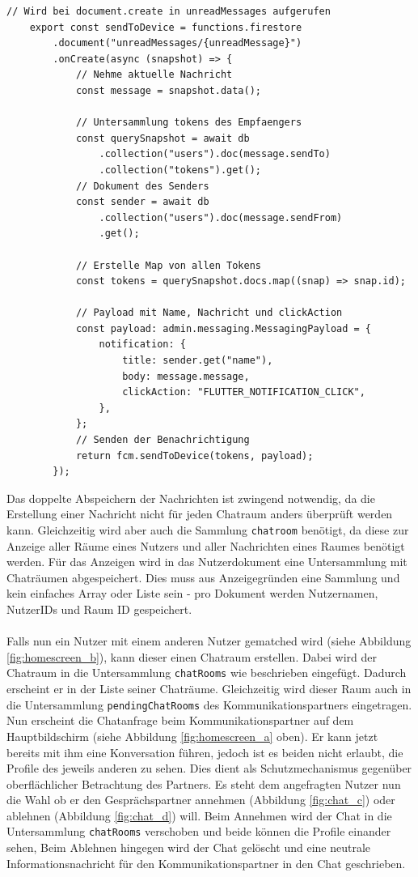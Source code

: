 \begin{lstlisting}[caption=Cloud Functions zur Erstellung von Benachrichtigungen, label=lst:chat_functions]
	// Wird bei document.create in unreadMessages aufgerufen
	export const sendToDevice = functions.firestore
		.document("unreadMessages/{unreadMessage}")
		.onCreate(async (snapshot) => {
			// Nehme aktuelle Nachricht
			const message = snapshot.data();
		
			// Untersammlung tokens des Empfaengers
			const querySnapshot = await db
				.collection("users").doc(message.sendTo)
				.collection("tokens").get();
			// Dokument des Senders
			const sender = await db
				.collection("users").doc(message.sendFrom)
				.get();
			
			// Erstelle Map von allen Tokens
			const tokens = querySnapshot.docs.map((snap) => snap.id);
			
			// Payload mit Name, Nachricht und clickAction
			const payload: admin.messaging.MessagingPayload = {
				notification: {
					title: sender.get("name"),
					body: message.message,
					clickAction: "FLUTTER_NOTIFICATION_CLICK",
				},
			};
			// Senden der Benachrichtigung
			return fcm.sendToDevice(tokens, payload);
		});
\end{lstlisting}

\noindent
Das doppelte Abspeichern der Nachrichten ist zwingend notwendig, da die Erstellung einer Nachricht nicht für jeden Chatraum anders überprüft werden kann.
Gleichzeitig wird aber auch die Sammlung \texttt{chatroom} benötigt, da diese zur Anzeige aller Räume eines Nutzers und aller Nachrichten eines Raumes benötigt werden.
Für das Anzeigen wird in das Nutzerdokument eine Untersammlung mit Chaträumen abgespeichert.
Dies muss aus Anzeigegründen eine Sammlung und kein einfaches Array oder Liste sein - pro Dokument werden Nutzernamen, NutzerIDs und Raum ID gespeichert.\\
\\
Falls nun ein Nutzer mit einem anderen Nutzer gematched wird (siehe Abbildung \ref{fig:homescreen_b}), kann dieser einen Chatraum erstellen.
Dabei wird der Chatraum in die Untersammlung \texttt{chatRooms} wie beschrieben eingefügt.
Dadurch erscheint er in der Liste seiner Chaträume.
Gleichzeitig wird dieser Raum auch in die Untersammlung \texttt{pendingChatRooms} des Kommunikationspartners eingetragen.
Nun erscheint die Chatanfrage beim Kommunikationspartner auf dem Hauptbildschirm (siehe Abbildung \ref{fig:homescreen_a} oben).
Er kann jetzt bereits mit ihm eine Konversation führen, jedoch ist es beiden nicht erlaubt, die Profile des jeweils anderen zu sehen.
Dies dient als Schutzmechanismus gegenüber oberflächlicher Betrachtung des Partners.
Es steht dem angefragten Nutzer nun die Wahl ob er den Gesprächspartner annehmen (Abbildung \ref{fig:chat_c}) oder ablehnen (Abbildung \ref{fig:chat_d}) will.
Beim Annehmen wird der Chat in die Untersammlung \texttt{chatRooms} verschoben und beide können die Profile einander sehen,
Beim Ablehnen hingegen wird der Chat gelöscht und eine neutrale Informationsnachricht für den Kommunikationspartner in den Chat geschrieben.
